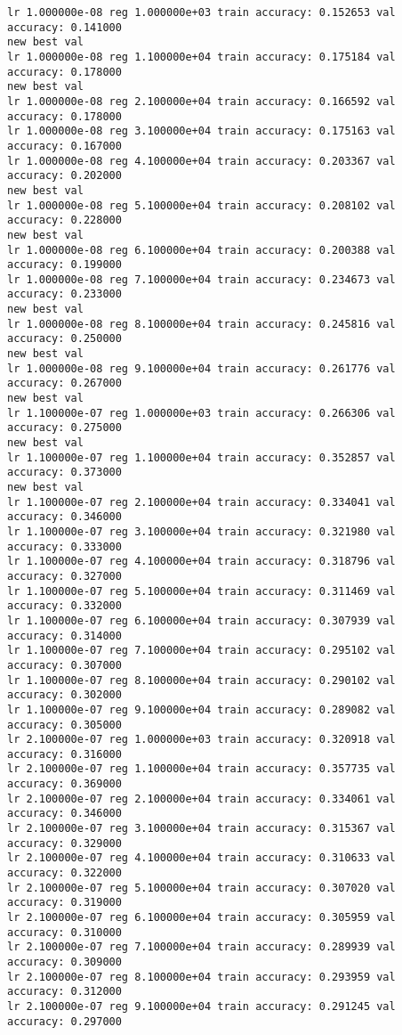 \documentclass[11pt]{article}
\begin{document}
    \begin{Verbatim}[commandchars=\\\{\}]
lr 1.000000e-08 reg 1.000000e+03 train accuracy: 0.152653 val accuracy: 0.141000
new best val
lr 1.000000e-08 reg 1.100000e+04 train accuracy: 0.175184 val accuracy: 0.178000
new best val
lr 1.000000e-08 reg 2.100000e+04 train accuracy: 0.166592 val accuracy: 0.178000
lr 1.000000e-08 reg 3.100000e+04 train accuracy: 0.175163 val accuracy: 0.167000
lr 1.000000e-08 reg 4.100000e+04 train accuracy: 0.203367 val accuracy: 0.202000
new best val
lr 1.000000e-08 reg 5.100000e+04 train accuracy: 0.208102 val accuracy: 0.228000
new best val
lr 1.000000e-08 reg 6.100000e+04 train accuracy: 0.200388 val accuracy: 0.199000
lr 1.000000e-08 reg 7.100000e+04 train accuracy: 0.234673 val accuracy: 0.233000
new best val
lr 1.000000e-08 reg 8.100000e+04 train accuracy: 0.245816 val accuracy: 0.250000
new best val
lr 1.000000e-08 reg 9.100000e+04 train accuracy: 0.261776 val accuracy: 0.267000
new best val
lr 1.100000e-07 reg 1.000000e+03 train accuracy: 0.266306 val accuracy: 0.275000
new best val
lr 1.100000e-07 reg 1.100000e+04 train accuracy: 0.352857 val accuracy: 0.373000
new best val
lr 1.100000e-07 reg 2.100000e+04 train accuracy: 0.334041 val accuracy: 0.346000
lr 1.100000e-07 reg 3.100000e+04 train accuracy: 0.321980 val accuracy: 0.333000
lr 1.100000e-07 reg 4.100000e+04 train accuracy: 0.318796 val accuracy: 0.327000
lr 1.100000e-07 reg 5.100000e+04 train accuracy: 0.311469 val accuracy: 0.332000
lr 1.100000e-07 reg 6.100000e+04 train accuracy: 0.307939 val accuracy: 0.314000
lr 1.100000e-07 reg 7.100000e+04 train accuracy: 0.295102 val accuracy: 0.307000
lr 1.100000e-07 reg 8.100000e+04 train accuracy: 0.290102 val accuracy: 0.302000
lr 1.100000e-07 reg 9.100000e+04 train accuracy: 0.289082 val accuracy: 0.305000
lr 2.100000e-07 reg 1.000000e+03 train accuracy: 0.320918 val accuracy: 0.316000
lr 2.100000e-07 reg 1.100000e+04 train accuracy: 0.357735 val accuracy: 0.369000
lr 2.100000e-07 reg 2.100000e+04 train accuracy: 0.334061 val accuracy: 0.346000
lr 2.100000e-07 reg 3.100000e+04 train accuracy: 0.315367 val accuracy: 0.329000
lr 2.100000e-07 reg 4.100000e+04 train accuracy: 0.310633 val accuracy: 0.322000
lr 2.100000e-07 reg 5.100000e+04 train accuracy: 0.307020 val accuracy: 0.319000
lr 2.100000e-07 reg 6.100000e+04 train accuracy: 0.305959 val accuracy: 0.310000
lr 2.100000e-07 reg 7.100000e+04 train accuracy: 0.289939 val accuracy: 0.309000
lr 2.100000e-07 reg 8.100000e+04 train accuracy: 0.293959 val accuracy: 0.312000
lr 2.100000e-07 reg 9.100000e+04 train accuracy: 0.291245 val accuracy: 0.297000

\end{Verbatim}
\end{document}
